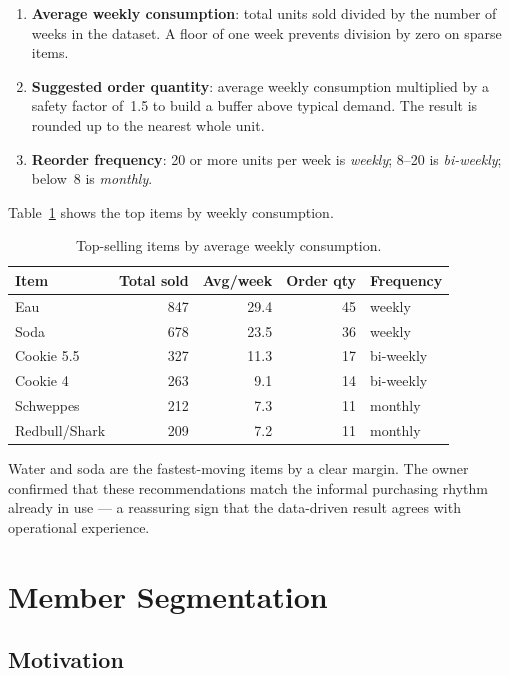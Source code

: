 \begin{enumerate}
  \item \textbf{Average weekly consumption}: total units sold divided by the number of
        weeks in the dataset. A floor of one week prevents division by zero on sparse
        items.
  \item \textbf{Suggested order quantity}: average weekly consumption multiplied by a
        safety factor of~1.5 to build a buffer above typical demand. The result is
        rounded up to the nearest whole unit.
  \item \textbf{Reorder frequency}: 20 or more units per week is \textit{weekly};
        8--20 is \textit{bi-weekly}; below~8 is \textit{monthly}.
\end{enumerate}

Table~\ref{tab:stock_top} shows the top items by weekly consumption.

\begin{table}[H]
  \centering
  \caption{Top-selling items by average weekly consumption.\label{tab:stock_top}}
  \begin{tabular}{lrrrl}
    \toprule
    \textbf{Item} & \textbf{Total sold} & \textbf{Avg/week} &
    \textbf{Order qty} & \textbf{Frequency} \\
    \midrule
    Eau            & 847 & 29.4 & 45 & weekly \\
    Soda           & 678 & 23.5 & 36 & weekly \\
    Cookie 5.5     & 327 & 11.3 & 17 & bi-weekly \\
    Cookie 4       & 263 &  9.1 & 14 & bi-weekly \\
    Schweppes      & 212 &  7.3 & 11 & monthly \\
    Redbull/Shark  & 209 &  7.2 & 11 & monthly \\
    \bottomrule
  \end{tabular}
\end{table}

Water and soda are the fastest-moving items by a clear margin. The owner confirmed that
these recommendations match the informal purchasing rhythm already in use --- a
reassuring sign that the data-driven result agrees with operational experience.

\section{Member Segmentation}

\subsection{Motivation}

